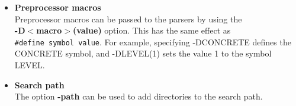 \begin{itemize}
\item{\textbf{Preprocessor macros}}\\
Preprocessor macros can be passed to the parsers by using the\\
\textbf{-D$<$macro$>$(value)} option. This has the same effect
as\\
\verb"#define symbol value". For example, specifying -DCONCRETE
defines the CONCRETE symbol, and -DLEVEL(1) sets the value 1 to
the symbol LEVEL.

\item{\textbf{Search path}}\\
The option \textbf{-path} can be used to add directories to the
search path.


\end{itemize}
